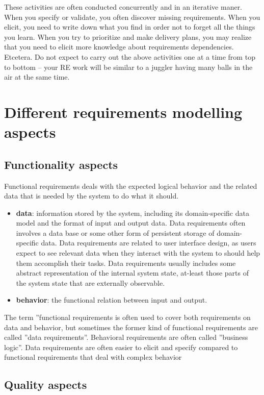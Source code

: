 These activities are often conducted concurrently and in an iterative maner. When you specify or validate, you often discover missing requirements. When you elicit, you need to write down what you find in order not to forget all the things you learn. When you try to prioritize and make delivery plans, you may realize that you need to elicit more knowledge about requirements dependencies. Etcetera. Do not expect to carry out the above activities one at a time from top to bottom -- your RE work will be similar to a juggler having many balls in the air at the same time. 

\section*{Different requirements modelling aspects}

\subsection*{Functionality aspects}
Functional requirements deals with the expected logical behavior and the related data that is needed by the system to do what it should.
\begin{itemize}
  \item \textbf{data}: information stored by the system, including its domain-specific data model and the format of input and output data. Data requirements often involves a data base or some other form of persistent storage of domain-specific data. Data requirements are related to user interface design, as users expect to see relevant data when they interact with the system to should help them accomplish their tasks. Data requirements usually includes some abstract representation of the internal system state, at-least those parts of the system state that are externally observable.
  \item \textbf{behavior}: the functional relation between input and output.
\end{itemize}

The term ''functional requirements is often used to cover both requirements on data and behavior, but sometimes the former kind of functional requirements are called ''data requirements''. Behavioral requirements are often called ''business logic''. Data requirements are often easier to elicit and specify compared to functional requirements that deal with complex behavior 

\subsection*{Quality aspects}


